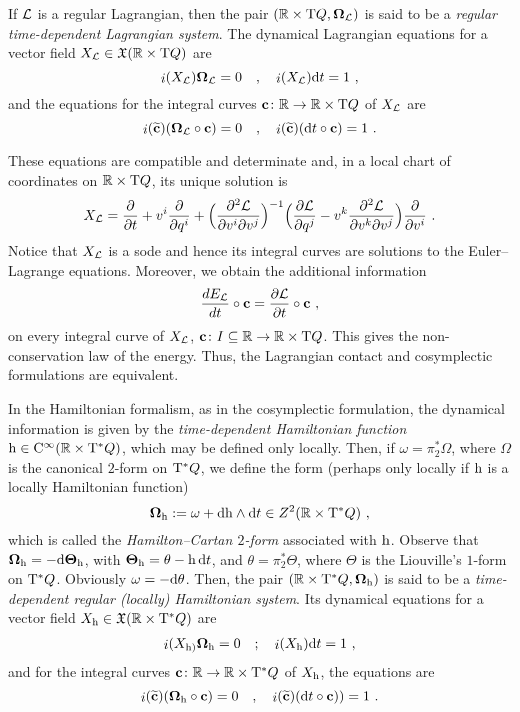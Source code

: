 \documentclass[12pt]{report}
\def\beq{\begin{equation}}
\def\eeq{\end{equation}}
\def\beann{\begin{eqnarray*}}
\def\eeann{\end{eqnarray*}}
\def\derpar#1#2{\frac{\partial{#1}}{\partial{#2}}}
\def\vf{\mathfrak X}
\def\Lag{{\cal L}}
\def\d{{\rm d}}
\def\Real{\mathbb{R}}
\def\Tan{{\rm T}}
\def\inn{\mathop{i}\nolimits}
\def\Cinfty{{\rm C}^\infty}
\begin{document}
If $\Lag$ is a regular Lagrangian, then the pair  $(\Real\times\Tan Q,\mbox{\boldmath $\Omega$}_\Lag)$
is said to be a {\sl regular time-dependent Lagrangian system}.
The dynamical Lagrangian equations for a vector field 
$X_{\cal L}\in\vf(\Real\times\Tan Q)$ are
\beq
\inn(X_{\cal L})\mbox{\boldmath $\Omega$}_\Lag = 0
\quad , \quad
\inn(X_{\cal L})\d t = 1 \ ,
\label{contacteq}
\eeq
and the equations for the integral curves ${\bf c}\colon\Real\to\Real\times\Tan Q$ of $X_{\cal L}$ are
$$
\inn(\widetilde{\bf c})(\mbox{\boldmath $\Omega$}_\Lag\circ{\bf c}) = 0
\quad , \quad
\inn(\widetilde{\bf c})(\d t\circ{\bf c}) = 1 \ .
$$

These equations are compatible and determinate and,
in a local chart of coordinates on $\Real\times\Tan Q$, its unique solution is
$$
X_{\cal L} =\derpar{}{t}+ v^i \derpar{}{q^i} + 
\Bigl(\displaystyle\frac{\partial^2{\cal L}}{\partial{v^i}\partial{v^j}}\Bigr)^{-1}
\Big(\derpar{{\cal L}}{q^j} -
v^k\frac{\partial^2{\cal L}}{\partial v^k \partial v^j}\Big)\derpar{}{v^i} \ .
$$
Notice that $X_{\cal L}$ is a {\sc sode} and hence
its integral curves are solutions to the Euler--Lagrange equations.
Moreover, we obtain the additional information
$$
\frac{dE_{\cal L}}{dt}\circ{\bf c} = \derpar{{\cal L}}{t}\circ{\bf c} \ ,
$$
on every integral curve of $X_\Lag$, ${\bf c}\colon I\subseteq\Real\to\Real\times\Tan Q$.
This gives the non-conservation law of the energy.
Thus, the Lagrangian contact and cosymplectic formulations are equivalent. 

In the Hamiltonian formalism, as in the cosymplectic formulation,
the dynamical information is given by the 
{\sl time-dependent Hamiltonian function}
${\rm h} \in\Cinfty(\Real\times\Tan^*Q)$,
which may be defined only locally.
Then, if $\omega=\pi_2^*\Omega$, where $\Omega$ is the canonical $2$-form on $\Tan^*Q$,
we define the form (perhaps only locally if ${\rm h}$
is a locally Hamiltonian function)
$$
\mbox{\boldmath $\Omega$}_ {\rm h }:= \omega + \d{\rm h} \wedge\d t \in Z^2(\Real\times\Tan^*Q) \ ,
$$
which is called the {\sl Hamilton--Cartan $2$-form} associated with ${\rm h}$.
Observe that  
$\mbox{\boldmath $\Omega$}_{\rm h}=-\d\mbox{\boldmath $\Theta$}_{\rm h}$, with
$\mbox{\boldmath $\Theta$}_{\rm h}=\theta-{\rm h}\,\d t$,
and $\theta=\pi_2^*\Theta$, where $\Theta$ is the Liouville's $1$-form on $\Tan^*Q$. Obviously $\omega=-\d\theta$.
Then, the pair $(\Real\times\Tan^*Q,\mbox{\boldmath $\Omega$}_{\rm h})$ is said to be a {\sl time-dependent regular (locally) Hamiltonian system}.
Its dynamical equations for a vector field 
$X_{\rm h}\in\vf(\Real\times\Tan^*Q)$ are
\beann
\inn(X_{\rm h)}\mbox{\boldmath $\Omega$}_{\rm h} = 0
\quad ; \quad
\inn(X_{\rm h})\d t = 1 \ ,
\eeann
and for the integral curves ${\bf c}\colon\Real\to\Real\times\Tan^*Q$ of $X_{\rm h}$, the equations are
$$
\inn(\widetilde{\bf c})(\mbox{\boldmath $\Omega$}_{\rm h}\circ{\bf c}) = 0
\quad , \quad
\inn(\widetilde{\bf c})(\d t\circ{\bf c})) = 1 \ .
$$
\end{document}
